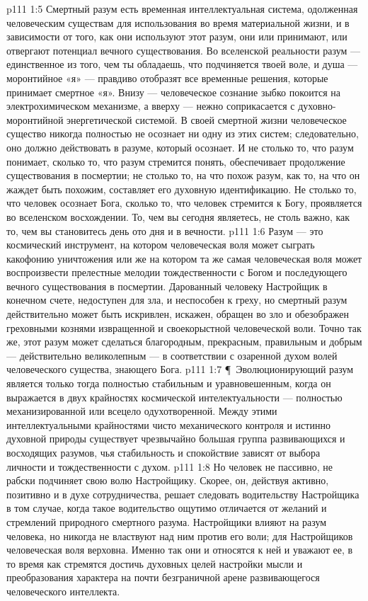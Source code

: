 \vs p111 1:5 Смертный разум есть временная интеллектуальная система, одолженная человеческим существам для использования во время материальной жизни, и в зависимости от того, как они используют этот разум, они или принимают, или отвергают потенциал вечного существования. Во вселенской реальности разум --- единственное из того, чем ты обладаешь, что подчиняется твоей воле, и душа --- моронтийное «я» --- правдиво отобразят все временные решения, которые принимает смертное «я». Внизу --- человеческое сознание зыбко покоится на электрохимическом механизме, а вверху --- нежно соприкасается с духовно\hyp{}моронтийной энергетической системой. В своей смертной жизни человеческое существо никогда полностью не осознает ни одну из этих систем; следовательно, оно должно действовать в разуме, который осознает. И не столько то, что разум понимает, сколько то, что разум стремится понять, обеспечивает продолжение существования в посмертии; не столько то, на что похож разум, как то, на что он жаждет быть похожим, составляет его духовную идентификацию. Не столько то, что человек осознает Бога, сколько то, что человек стремится к Богу, проявляется во вселенском восхождении. То, чем вы сегодня являетесь, не столь важно, как то, чем вы становитесь день ото дня и в вечности.
\vs p111 1:6 Разум --- это космический инструмент, на котором человеческая воля может сыграть какофонию уничтожения или же на котором та же самая человеческая воля может воспроизвести прелестные мелодии тождественности с Богом и последующего вечного существования в посмертии. Дарованный человеку Настройщик в конечном счете, недоступен для зла, и неспособен к греху, но смертный разум действительно может быть искривлен, искажен, обращен во зло и обезображен греховными кознями извращенной и своекорыстной человеческой воли. Точно так же, этот разум может сделаться благородным, прекрасным, правильным и добрым --- действительно великолепным --- в соответствии с озаренной духом волей человеческого существа, знающего Бога.
\vs p111 1:7 \P\ Эволюционирующий разум является только тогда полностью стабильным и уравновешенным, когда он выражается в двух крайностях космической интелектуальности --- полностью механизированной или всецело одухотворенной. Между этими интеллектуальными крайностями чисто механического контроля и истинно духовной природы существует чрезвычайно большая группа развивающихся и восходящих разумов, чья стабильность и спокойствие зависят от выбора личности и тождественности с духом.
\vs p111 1:8 Но человек не пассивно, не рабски подчиняет свою волю Настройщику. Скорее, он, действуя активно, позитивно и в духе сотрудничества, решает следовать водительству Настройщика в том случае, когда такое водительство ощутимо отличается от желаний и стремлений природного смертного разума. Настройщики влияют на разум человека, но никогда не властвуют над ним против его воли; для Настройщиков человеческая воля верховна. Именно так они и относятся к ней и уважают ее, в то время как стремятся достичь духовных целей настройки мысли и преобразования характера на почти безграничной арене развивающегося человеческого интеллекта.
